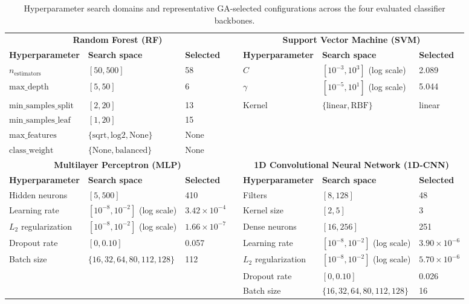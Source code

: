 \begin{table}
\centering
\caption{Hyperparameter search domains and representative GA-selected configurations across the four evaluated classifier backbones.}
\label{tab:all_hyperparameters}
\small
\begin{tabular}{lllclll}\toprule
\multicolumn{3}{c}{\textbf{Random Forest (RF)}} & & \multicolumn{3}{c}{\textbf{Support Vector Machine (SVM)}} \\\cmidrule{1-3}\cmidrule{5-7}
\textbf{Hyperparameter} & \textbf{Search space} & \textbf{Selected} & & \textbf{Hyperparameter} & \textbf{Search space} & \textbf{Selected}\\\midrule
$n_{\mathrm{estimators}}$ & $[50,500]$ & 58 & & $C$ & $[10^{-3},10^{3}]$ (log scale) & 2.089\\
$\mathrm{max\_depth}$ & $[5,50]$ & 6 & & $\gamma$ & $[10^{-5},10^{1}]$ (log scale) & 5.044\\
$\mathrm{min\_samples\_split}$ & $[2,20]$ & 13 & & Kernel & $\{\mathrm{linear},\mathrm{RBF}\}$ & linear\\
$\mathrm{min\_samples\_leaf}$ & $[1,20]$ & 15 & & & & \\
$\mathrm{max\_features}$ & $\{\mathrm{sqrt},\mathrm{log2},\mathrm{None}\}$ & None & & & & \\
$\mathrm{class\_weight}$ & $\{\mathrm{None},\mathrm{balanced}\}$ & None & & & & \\\midrule
\multicolumn{3}{c}{\textbf{Multilayer Perceptron (MLP)}} & & \multicolumn{3}{c}{\textbf{1D Convolutional Neural Network (1D-CNN)}} \\\cmidrule{1-3}\cmidrule{5-7}
\textbf{Hyperparameter} & \textbf{Search space} & \textbf{Selected} & & \textbf{Hyperparameter} & \textbf{Search space} & \textbf{Selected}\\\midrule
Hidden neurons & $[5,500]$ & 410 & & Filters & $[8,128]$ & 48\\
Learning rate & $[10^{-8},10^{-2}]$ (log scale) & $3.42\times10^{-4}$ & & Kernel size & $[2,5]$ & 3\\
$L_2$ regularization & $[10^{-8},10^{-2}]$ (log scale) & $1.66\times10^{-7}$ & & Dense neurons & $[16,256]$ & 251\\
Dropout rate & $[0,0.10]$ & 0.057 & & Learning rate & $[10^{-8},10^{-2}]$ (log scale) & $3.90\times10^{-6}$\\
Batch size & $\{16,32,64,80,112,128\}$ & 112 & & $L_2$ regularization & $[10^{-8},10^{-2}]$ (log scale) & $5.70\times10^{-6}$\\
& & & & Dropout rate & $[0,0.10]$ & 0.026\\
& & & & Batch size & $\{16,32,64,80,112,128\}$ & 16\\\bottomrule
\end{tabular}
\end{table}

